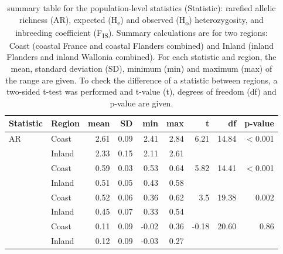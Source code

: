 \documentclass[10pt, twoside]{book} %
\begin{document}
	
		\begin{table}[h!]
			\begin{center}
				\begin{footnotesize}
					\caption{summary table for the population-level statistics (Statistic): rarefied allelic richness (AR), expected (H\textsubscript{e}) and observed (H\textsubscript{o}) heterozygosity, and inbreeding coefficient (F\textsubscript{IS}). Summary calculations are for two regions: Coast (coastal France and coastal Flanders combined) and Inland (inland Flanders and inland Wallonia combined). For each statistic and region, the mean, standard deviation (SD), minimum (min) and maximum (max) of the range are given. To check the difference of a statistic between regions, a two-sided t-test was performed and t-value (t), degrees of freedom (df) and p-value are given.}  \label{Tab4.1}
					
					\begingroup
					\setlength{\tabcolsep}{6pt} %
					\renewcommand{\arraystretch}{1.5} %
					\begin{tabular}{p{1.5cm} l r r r r p{1cm} p{1cm} p{1.2cm}} %
					
					\toprule
					\textbf{Statistic} & \textbf{Region} & \textbf{mean} & \textbf{SD} & \textbf{min} & \textbf{max} & \multicolumn{1}{r}{\textbf{t}} & \multicolumn{1}{r}{\textbf{df}} & \multicolumn{1}{r}{\textbf{p-value}} \\
					\midrule
					\multirow{2}{*}{AR} & Coast& 2.61 &0.09 &2.41 & 2.84 &
					\multicolumn{1}{r}{\multirow{2}{*}{6.21}} &  \multicolumn{1}{r}{\multirow{2}{*}{14.84}} & \multicolumn{1}{r}{\multirow{2}{*}{$<$0.001}}\\
					& Inland& 2.33 &0.15 &2.11 &2.61 &&&\\
					\arrayrulecolor{black!30}\midrule[0.3pt]
					\multirow{2}{*}{H\textsubscript{e}} & Coast& 0.59& 0.03 & 0.53& 0.64& 
					\multicolumn{1}{r}{\multirow{2}{*}{5.82}} &  \multicolumn{1}{r}{\multirow{2}{*}{14.41}} & \multicolumn{1}{r}{\multirow{2}{*}{$<$0.001}}\\
					& Inland& 0.51 &0.05 & 0.43 & 0.58 &&&\\
					\arrayrulecolor{black!30}\midrule[0.3pt]
					\multirow{2}{*}{H\textsubscript{o}} & Coast& 0.52 & 0.06 & 0.36 & 0.62& 
					\multicolumn{1}{r}{\multirow{2}{*}{3.5}} &  \multicolumn{1}{r}{\multirow{2}{*}{19.38}} & \multicolumn{1}{r}{\multirow{2}{*}{0.002}}\\
					& Inland& 0.45 &0.07 & 0.33 & 0.54 &&&\\
					\arrayrulecolor{black!30}\midrule[0.3pt]
					\multirow{2}{*}{F\textsubscript{IS}} & Coast& 0.11 & 0.09 & -0.02 & 0.36 & 
					\multicolumn{1}{r}{\multirow{2}{*}{-0.18}} &  \multicolumn{1}{r}{\multirow{2}{*}{20.60}} & \multicolumn{1}{r}{\multirow{2}{*}{0.86}}\\
					& Inland& 0.12 &0.09 & -0.03 & 0.27 &&&\\
					

\end{tabular}
\end{footnotesize}
\end{center}
\end{table}
\end{document}

